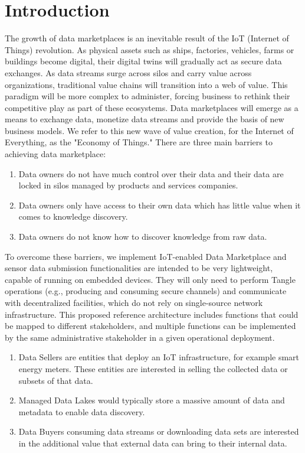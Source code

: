 \documentclass[journal,a4paper]{IEEEtran}
\begin{document}
\section{Introduction}
The growth of data marketplaces is an inevitable result of the IoT (Internet of Things) revolution. As physical assets such as ships, factories, vehicles, farms or buildings become digital, their digital twins will gradually act as secure data exchanges.\cite{digitaltwin} As data streams surge across silos and carry value across organizations, traditional value chains will transition into a web of value. This paradigm will be more complex to administer, forcing business to rethink their competitive play as part of these ecosystems. Data marketplaces will emerge as a means to exchange data, monetize data streams and provide the basis of new business models. We refer to this new wave of value creation, for the Internet of Everything, as the "Economy of Things." There are three main barriers to achieving data marketplace:
\begin{enumerate}
  \item Data owners do not have much control over their data and their data are locked in silos managed by products and services companies.
  \item Data owners only have access to their own data which has little value when it comes to knowledge discovery.
  \item Data owners do not know how to discover knowledge from raw data.
\end{enumerate}

To overcome these barriers, we implement IoT-enabled Data Marketplace and sensor data submission functionalities are intended to be very lightweight, capable of running on embedded devices. They will only need to perform Tangle operations (e.g., producing and consuming secure channels) and communicate with decentralized facilities, which do not rely on single-source network infrastructure. This proposed reference architecture includes functions that could be mapped to different stakeholders, and multiple functions can be implemented by the same administrative stakeholder in a given operational deployment.
\begin{enumerate}
  \item Data Sellers are entities that deploy an IoT infrastructure, for example smart energy meters. These entities are interested in selling the collected data or subsets of that data.
  \item Managed Data Lakes would typically store a massive amount of data and metadata to enable data discovery.
  \item Data Buyers consuming data streams or downloading data sets are interested in the additional value that external data can bring to their internal data.
\end{enumerate}
\end{document}
